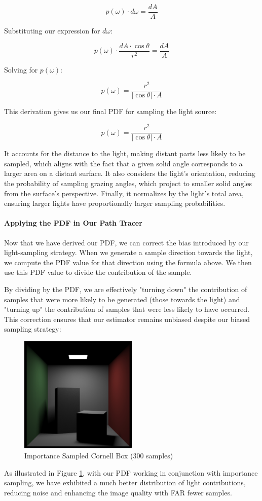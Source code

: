 \documentclass[12pt]{article}
\begin{document}
$$p(\omega) \cdot d\omega = \frac{dA}{A}$$

Substituting our expression for $d\omega$:

$$p(\omega) \cdot \frac{dA \cdot \cos\theta}{r^2} = \frac{dA}{A}$$

Solving for $p(\omega)$:

$$p(\omega) = \frac{r^2}{|\cos\theta| \cdot A}$$


This derivation gives us our final PDF for sampling the light source:

$$p(\omega) = \frac{r^2}{|\cos\theta| \cdot A}$$

It accounts for the distance to the light, making distant parts less likely to be sampled, which aligns with the fact that a given solid angle corresponds to a larger area on a distant surface. It also considers the light's orientation, reducing the probability of sampling grazing angles, which project to smaller solid angles from the surface's perspective. Finally, it normalizes by the light's total area, ensuring larger lights have proportionally larger sampling probabilities.

\paragraph{Applying the PDF in Our Path Tracer}

Now that we have derived our PDF, we can correct the bias introduced by our light-sampling strategy. When we generate a sample direction towards the light, we compute the PDF value for that direction using the formula above. We then use this PDF value to divide the contribution of the sample.

By dividing by the PDF, we are effectively "turning down" the contribution of samples that were more likely to be generated (those towards the light) and "turning up" the contribution of samples that were less likely to have occurred. This correction ensures that our estimator remains unbiased despite our biased sampling strategy:

\begin{figure}[H]
    \centering
    \includegraphics[width=0.5\textwidth]{images/importance_sampled.png}
    \caption{Importance Sampled Cornell Box (300 samples)}
    \label{fig:importancesampled}
\end{figure}
As illustrated in Figure \ref{fig:importancesampled}, with our PDF working in conjunction with importance sampling, we have exhibited a much better distribution of light contributions, reducing noise and enhancing the image quality with FAR fewer samples.
\end{document}
